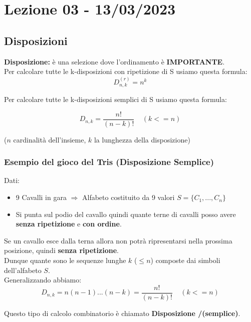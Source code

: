 \section{Lezione 03 - 13/03/2023}

\subsection{Disposizioni}
\textbf{Disposizione:} è una selezione dove l'ordinamento è  \textbf{IMPORTANTE}.\\
Per calcolare tutte le k-disposizioni con ripetizione di S usiamo questa formula:
$$ D^{(r)}_{n,k} = n^k$$ 

Per calcolare tutte le k-disposizioni semplici di S usiamo questa formula:

$$ D_{n,k} = \frac{n!}{(n-k)!} \: \: \: \: \: (k<=n)$$ 

\begin{center}
($n$ cardinalità dell'insieme, $k$ la lunghezza della disposizione)
\end{center}

\subsubsection{Esempio del gioco del Tris (Disposizione Semplice)}
Dati:
\begin{itemize}
\item 9 Cavalli in gara $\Rightarrow$ Alfabeto costituito da 9 valori
$S = \{C_1,..., C_n\}$
\item Si punta sul podio del cavallo quindi quante terne di cavalli posso avere \textbf{senza ripetizione} e \textbf{con ordine}.
\end{itemize}
Se un cavallo esce dalla terna allora non potrà ripresentarsi nella prossima posizione, quindi \textbf{senza ripetizione}.\\
Dunque quante sono le sequenze lunghe $k$ ($\le n$) composte dai simboli dell'alfabeto $S$.\\
Generalizzando abbiamo:	
$$ D_{n,k} = n(n-1)...(n-k) = \frac{n!}{(n-k)!} \: \: \: \: \: (k<=n)$$ 

Questo tipo di calcolo combinatorio è chiamato \textbf{Disposizione /(semplice)}.\\



